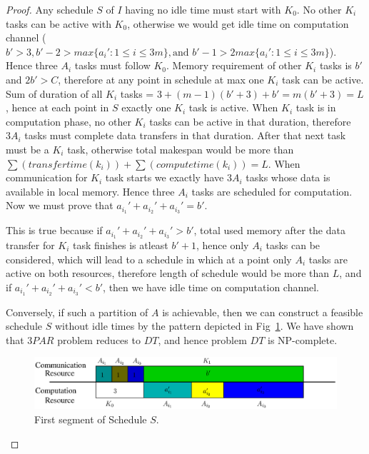 \documentclass[sigconf]{acmart}
\begin{document}
\begin{proof}
	Any schedule $S$ of $I$ having no idle time must start with $K_0$. No other $K_i$ tasks can be active with $K_0$, otherwise we would get idle time on computation channel ($b'>3, b'-2>max\{a_i':1\le i\le 3m\},  \text{and } b'-1 > 2 max\{a_i':1\le i\le 3m\}$). Hence three $A_i$ tasks must follow $K_0$.   	 
	Memory requirement of other $K_i$ tasks is $b'$ and $2b'>C$, therefore at any point in schedule at max one $K_i$ task can be active. Sum of duration of all $K_i$ tasks = $3 + (m-1)(b'+3) + b' = m (b'+3)=L$, hence at each point in $S$ exactly one $K_i$ task is active. When $K_i$ task is in computation phase, no other $K_i$ tasks can be active in that duration, therefore  $3A_i$ tasks must complete data transfers in that duration. After that next task must be a 
	$K_i$ task, otherwise total makespan would be more than $\sum(transfertime(k_i))  + 
	\sum(computetime(k_i)) =L$. When communication for  $K_i$ task starts we exactly have $3A_i$ 
	tasks whose data is available in local memory. Hence three $A_i$ tasks are scheduled for computation. Now we must prove that $a_{i_1}' + a_{i_2}'  + a_{i_3}'  = b'$.
	
	This is true because if $a_{i_1}' + a_{i_2}'  + a_{i_3}'  > b'$, total used memory after the data transfer 
	for  $K_i$ task finishes is atleast $b'+1$, hence only $A_i$ tasks can be considered, which will lead to a schedule in which at a point only $A_i$ tasks are active on both resources, therefore length of 
	schedule would be more than $L$, and if $a_{i_1}' + a_{i_2}'  + a_{i_3}'  < b'$, then we have idle time on computation channel.
	
	Conversely, if such a partition of $A$ is achievable, then we can construct a feasible schedule $S$ 
	without idle times by the pattern depicted in Fig~\ref{fig:firstSegment}. We have shown that $3PAR$ 
	problem reduces to $DT$, and hence problem $DT$ is NP-complete.
	
	\begin{figure}[htb]
		\centering
		\includegraphics[scale=0.5]{Figs/first_segment}
		\caption{ \label{fig:firstSegment} First segment of Schedule $S$.}
	\end{figure}
	
\end{proof}
\end{document}

